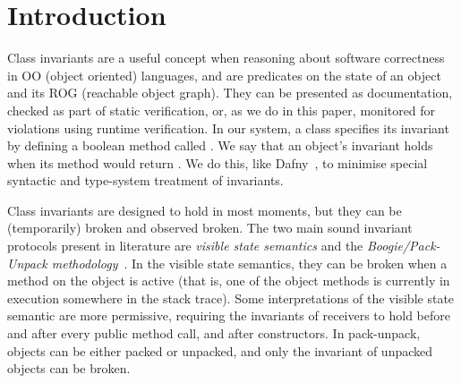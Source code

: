 \section{Introduction}
\label{s:intro}
Class invariants are
a useful concept when reasoning about software correctness in OO (object oriented) languages, and are predicates on the state of an object and its ROG (reachable object graph).
They can be presented as documentation, checked as part of static verification, or, as we do in this paper, monitored for violations using runtime verification.
In our system, a class specifies its invariant by defining a boolean method called \Q@invariant@.
We say that an object's invariant holds when its \Q@invariant@ method would return \Q@true@. 
We do this, like Dafny~\cite{DBLP:conf/sigada/Leino12}, to minimise special syntactic and type-system treatment of invariants.%

Class invariants are designed to hold in most moments, but they can be (temporarily) broken and observed broken.
The two main sound invariant protocols present in literature are \emph{visible state semantics} \cite{Meyer:1988:OSC:534929} and the \emph{Boogie/Pack-Unpack methodology}~\cite{DBLP:journals/jot/BarnettDFLS04}.
In the visible state semantics, they can be broken when a method on the object is active (that is, one of the object methods is currently in execution somewhere in the stack trace).
Some interpretations of the visible state semantic are more permissive, requiring the invariants of receivers to hold before and after every public method call, and after constructors. 
In pack-unpack, objects can be either packed or unpacked, and only the invariant of unpacked objects can be broken.




